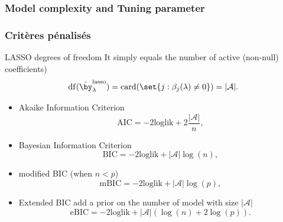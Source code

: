 \documentclass{beamer}\usepackage[]{graphicx}\usepackage[]{color}
\begin{document}
\subsubsection{Model complexity and Tuning parameter}

\begin{frame}
  \frametitle{Critères pénalisés}

  \begin{block}{LASSO degrees of freedom}
    It simply equals the number of active (non-null) coefficients)
\[
\mathrm{df}(\hat{\by}_\lambda^{\text{lasso}}) = \mathrm{card}(\set{j:\beta_j(\lambda)\neq 0}) = |\mathcal{A}|.
\]
  \end{block}

  \begin{itemize}
    \item \alert{Akaike Information Criterion} 
        \begin{equation*}
          \mathrm{AIC} = -2 \mathrm{loglik} + 2\frac{|\mathcal{A}|}{n},
        \end{equation*}
      \item \alert{Bayesian   Information   Criterion}
        \begin{equation*}
          \mathrm{BIC} = -2\mathrm{loglik} + |\mathcal{A}|\log(n),
        \end{equation*}
      \item \alert{modified BIC} (when $n < p$)
        \begin{equation*}
          \mathrm{mBIC} = -2\mathrm{loglik} + |\mathcal{A}|\log(p),
        \end{equation*}
      \item \alert{Extended BIC} add a prior on the number of model with size  $|\mathcal{A}|$
        \begin{equation*}
          \mathrm{eBIC} = -2\mathrm{loglik} + |\mathcal{A}|(\log(n) + 2\log(p)).
        \end{equation*}
      \end{itemize}
\end{frame}
\end{document}
